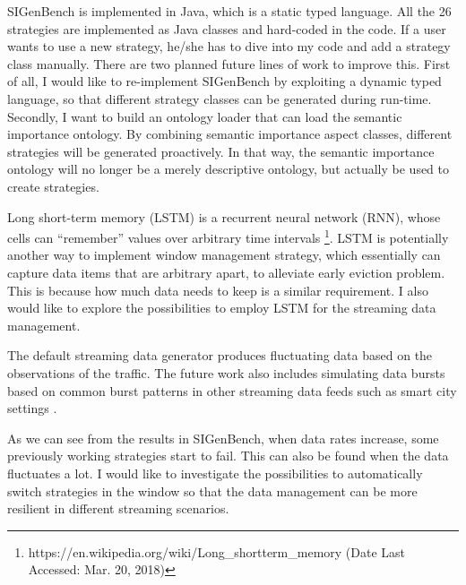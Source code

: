 SIGenBench is implemented in Java, which is a static typed language.
All the 26 strategies are implemented as Java classes and hard-coded in the code. 
If a user wants to use a new strategy, he/she has to dive into my code and add a strategy class manually. 
There are two planned future lines of work to improve this. 
First of all, I would like to re-implement SIGenBench by exploiting a dynamic typed language, so that different strategy classes can be generated during run-time. 
Secondly, I want to build an ontology loader that can load the semantic importance ontology.
By combining semantic importance aspect classes, different strategies will be generated proactively. 
In that way, the semantic importance ontology will no longer be a merely descriptive ontology, but actually be used to create strategies.

Long short-term memory (LSTM) \cite{DBLP:journals/neco/HochreiterS97} is a recurrent neural network (RNN), whose cells can ``remember'' values over arbitrary time intervals \footnote{https://en.wikipedia.org/wiki/Long\_short\-term\_memory (Date Last Accessed: Mar. 20, 2018)}.
LSTM is potentially another way to implement window management strategy, which essentially can capture data items that are arbitrary apart, to alleviate early eviction problem. 
This is because how much data needs to keep is a similar requirement. 
I also would like to explore the possibilities to employ LSTM for the streaming data management. 

The default streaming data generator produces fluctuating data based on the observations of the traffic. 
The future work also includes simulating data bursts based on common burst patterns in other streaming data feeds such as smart city settings \cite{tonjes2014real}.

As we can see from the results in SIGenBench, when data rates increase, some previously working strategies start to fail.
This can also be found when the data fluctuates a lot.
I would like to investigate the possibilities to automatically switch strategies in the window so that the data management can be more resilient in different streaming scenarios. 
%
